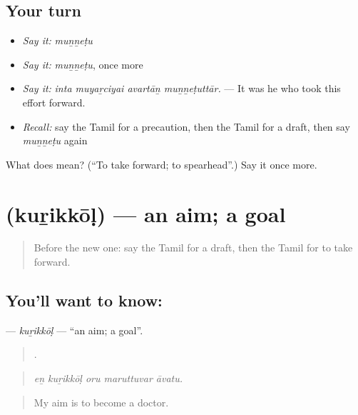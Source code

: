 \subsection*{Your turn}
\begin{itemize}
\raggedright
  \item \emph{Say it:} \emph{muṉṉeṭu}
  \item \emph{Say it:} \emph{muṉṉeṭu}, once more
  \item \emph{Say it:} \emph{inta muyaṟciyai avartāṉ muṉṉeṭuttār.} — It was he who took this effort forward.
  \item \emph{Recall:} say the Tamil for a precaution, then the Tamil for a draft, then say \emph{muṉṉeṭu} again
\end{itemize}

\begin{tcolorbox}[breakable,colback=teal!4,colframe=teal!35!black,title={Before you move on}]
What does  mean? (\textquotedblleft{}To take forward; to spearhead\textquotedblright{}.) Say it once more.
\end{tcolorbox}
\section[\texorpdfstring{\ta{குறிக்கோள்} (kuṟikkōḷ)}{குறிக்கோள் (kuṟikkōḷ)}]{ (kuṟikkōḷ) — an aim; a goal}

\label{lesson:TA-C386-kurikkol}



\begin{quote}
Before the new one: say the Tamil for a draft, then the Tamil for to take forward.
\end{quote}

\subsection*{You'll want to know: }
\textbf{} — \emph{kuṟikkōḷ} — \textquotedblleft{}an aim; a goal\textquotedblright{}.

\begin{quote}
    .
\end{quote}

\begin{quote}
\emph{eṉ kuṟikkōḷ oru maruttuvar āvatu.}
\end{quote}

\begin{quote}
My aim is to become a doctor.
\end{quote}


